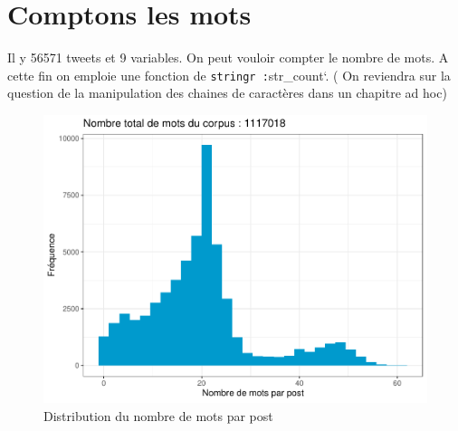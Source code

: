 \documentclass[
]{book}
\newenvironment{Shaded}{\begin{snugshade}}{\end{snugshade}}
\newcommand{\CommentTok}[1]{\textcolor[rgb]{0.56,0.35,0.01}{\textit{#1}}}
\newcommand{\DataTypeTok}[1]{\textcolor[rgb]{0.13,0.29,0.53}{#1}}
\newcommand{\DecValTok}[1]{\textcolor[rgb]{0.00,0.00,0.81}{#1}}
\newcommand{\KeywordTok}[1]{\textcolor[rgb]{0.13,0.29,0.53}{\textbf{#1}}}
\newcommand{\NormalTok}[1]{#1}
\newcommand{\OperatorTok}[1]{\textcolor[rgb]{0.81,0.36,0.00}{\textbf{#1}}}
\newcommand{\StringTok}[1]{\textcolor[rgb]{0.31,0.60,0.02}{#1}}
\begin{document}
\hypertarget{comptons-les-mots}{%
\section{Comptons les mots}\label{comptons-les-mots}}

Il y 56571 tweets et 9 variables. On peut vouloir compter le nombre de mots. A cette fin on emploie une fonction de \texttt{stringr\ :}str\_count`. ( On reviendra sur la question de la manipulation des chaines de caractères dans un chapitre ad hoc)

\begin{Shaded}
\end{Shaded}

\begin{figure}

{\centering \includegraphics[width=0.8\linewidth]{bookdown-demo_files/figure-latex/1-1} 

}

\caption{Distribution du nombre de mots par post}\label{fig:1}
\end{figure}
\end{document}
